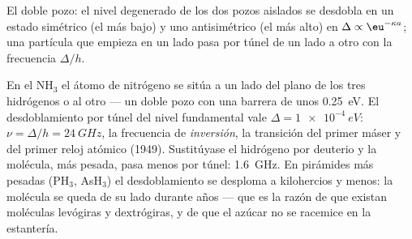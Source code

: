 \begin{omfigure}

{\small El doble pozo: el nivel degenerado de los dos pozos aislados
se desdobla en un estado simétrico (el más bajo) y uno antisimétrico
(el más alto) en $\Delta \propto \eu^{-\kappa a}$; una partícula que empieza en un lado
pasa por túnel de un lado a otro con la frecuencia $\Delta/h$.}
\end{omfigure}

\begin{example}[El amoniaco]\label{ex:b2:potential-wells-tunneling:ammonia}
En el NH$_3$ el átomo de nitrógeno se sitúa a un lado del plano de los tres
hidrógenos o al otro --- un doble pozo con una barrera de unos
\qty{0.25}{eV}. El desdoblamiento por túnel del nivel fundamental vale $\Delta =
\qty{1e-4}{eV}$: $\nu = \Delta/h = \qty{24}{GHz}$, la frecuencia de
\emph{inversión}, la transición del primer máser y del primer reloj
atómico (1949). Sustitúyase el hidrógeno por deuterio y la molécula, más pesada,
pasa menos por túnel: \qty{1.6}{GHz}. En pirámides más pesadas (PH$_3$, AsH$_3$) el
desdoblamiento se desploma a kilohercios y menos: la molécula se queda de su
lado durante años --- que es la razón de que existan moléculas levógiras y dextrógiras,
y de que el azúcar no se racemice en la estantería.
\end{example}

